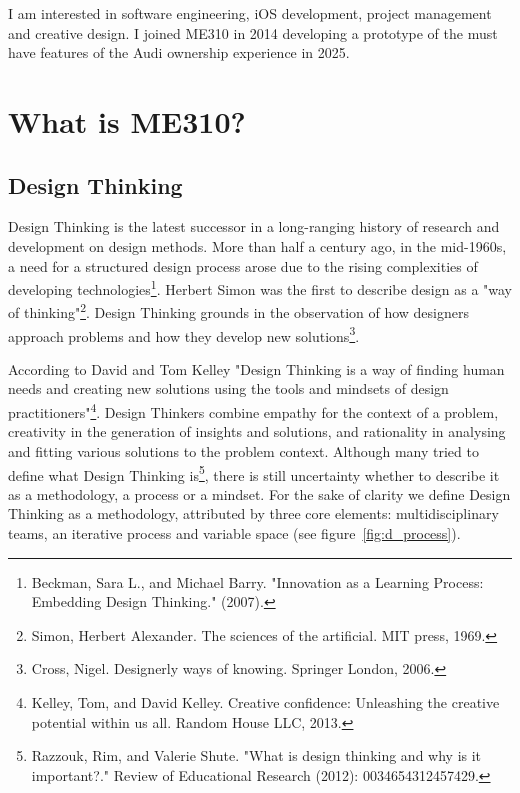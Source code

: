 I am interested in software engineering, iOS development, project management and creative design. I joined ME310 in 2014 developing a prototype of the must have features of the Audi ownership experience in 2025.


\section{What is ME310?}

\subsection{Design Thinking}

Design Thinking is the latest successor in a long-ranging history of research and development on design methods. More than half a century ago, in the mid-1960s, a need for a structured design process arose due to the rising complexities of developing technologies\footnote{Beckman, Sara L., and Michael Barry. "Innovation as a Learning Process: Embedding Design Thinking." (2007).}. Herbert Simon was the first to describe design as a "way of thinking"\footnote{Simon, Herbert Alexander. The sciences of the artificial. MIT press, 1969.}. Design Thinking grounds in the observation of how designers approach problems and how they develop new solutions\footnote{Cross, Nigel. Designerly ways of knowing. Springer London, 2006.}. 

According to David and Tom Kelley "Design Thinking is a way of finding human needs and creating new solutions using the tools and mindsets of design practitioners"\footnote{Kelley, Tom, and David Kelley. Creative confidence: Unleashing the creative potential within us all. Random House LLC, 2013.}. Design Thinkers combine empathy for the context of a problem, creativity in the generation of insights and solutions, and rationality in analysing and fitting various solutions to the problem context.
Although many tried to define what Design Thinking is\footnote{Razzouk, Rim, and Valerie Shute. "What is design thinking and why is it important?." Review of Educational Research (2012): 0034654312457429.}, there is still uncertainty whether to describe it as a methodology, a process or a mindset. For the sake of clarity we define Design Thinking as a methodology, attributed by three core elements: multidisciplinary teams, an iterative process and variable space (see figure~\ref{fig:d_process}).

